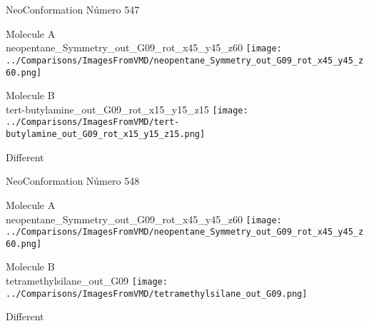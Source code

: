  \newpage

\vtab[-3cm]
\begin{center}
{\large NeoConformation \tab Número 547}
\end{center}
\begin{multicols}{2}
\begin{center}
Molecule A \\ 
neopentane\_Symmetry\_out\_G09\_rot\_x45\_y45\_z60
\texttt{[image: ../Comparisons/ImagesFromVMD/neopentane\_Symmetry\_out\_G09\_rot\_x45\_y45\_z60.png]}
\\
\vtab

\columnbreak
Molecule B \\ 
tert-butylamine\_out\_G09\_rot\_x15\_y15\_z15
\texttt{[image: ../Comparisons/ImagesFromVMD/tert-butylamine\_out\_G09\_rot\_x15\_y15\_z15.png]}
\\
\vtab


\end{center}
\end{multicols}
\begin{center}
\textcolor{NavyBlue}{\Large Different}
\end{center}

 \newpage

\vtab[-3cm]
\begin{center}
{\large NeoConformation \tab Número 548}
\end{center}
\begin{multicols}{2}
\begin{center}
Molecule A \\ 
neopentane\_Symmetry\_out\_G09\_rot\_x45\_y45\_z60
\texttt{[image: ../Comparisons/ImagesFromVMD/neopentane\_Symmetry\_out\_G09\_rot\_x45\_y45\_z60.png]}
\\
\vtab

\columnbreak
Molecule B \\ 
tetramethylsilane\_out\_G09
\texttt{[image: ../Comparisons/ImagesFromVMD/tetramethylsilane\_out\_G09.png]}
\\
\vtab


\end{center}
\end{multicols}
\begin{center}
\textcolor{NavyBlue}{\Large Different}
\end{center}

 \newpage

